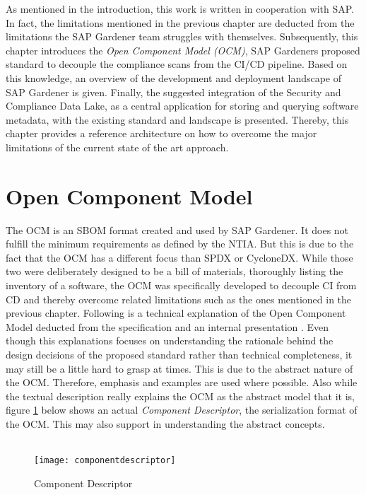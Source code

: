 As mentioned in the introduction, this work is written in cooperation with SAP. In fact, the limitations mentioned in the previous chapter are deducted from the limitations the SAP Gardener team struggles with themselves. Subsequently, this chapter introduces the \textit{Open Component Model (OCM)}, SAP Gardeners proposed standard to decouple the compliance scans from the CI/CD pipeline. Based on this knowledge, an overview of the development and deployment landscape of SAP Gardener is given. Finally, the suggested integration of the Security and Compliance Data Lake, as a central application for storing and querying software metadata, with the existing standard and landscape is presented. Thereby, this chapter provides a reference architecture on how to overcome the major limitations of the current state of the art approach. 

\section{Open Component Model}
The OCM is an SBOM format created and used by SAP Gardener. It does not fulfill the minimum requirements as defined by the NTIA. But this is due to the fact that the OCM has a different focus than SPDX or CycloneDX. While those two were deliberately designed to be a bill of materials, thoroughly listing the inventory of a software, the OCM was specifically developed to decouple CI from CD and thereby overcome related limitations such as the ones mentioned in the previous chapter. Following is a technical explanation of the Open Component Model deducted from the specification \cite{OCMSpec} and an internal presentation \cite{OCMInternalPresentation}. Even though this explanations focuses on understanding the rationale behind the design decisions of the proposed standard rather than technical completeness, it may still be a little hard to grasp at times. This is due to the abstract nature of the OCM. Therefore, emphasis and examples are used where possible. Also while the textual description really explains the OCM as the abstract model that it is, figure \ref{fig:ComponentDescriptor} below shows an actual \emph{Component Descriptor}, the serialization format of the OCM. This may also support in understanding the abstract concepts.\\\\

\begin{figure}[H]
	\centering
	\texttt{[image: componentdescriptor]}
	\caption[Component Descriptor]{Component Descriptor }
	\label{fig:ComponentDescriptor}
\end{figure}


